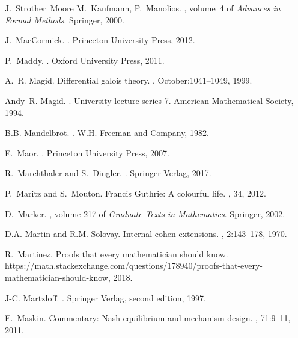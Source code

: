 \documentclass[12pt]{amsart}
\begin{document}
\begin{thebibliography}{100}
J.~Strother~Moore M.~Kaufmann, P.~Manolios.
, volume~4 of {\em
  Advances in Formal Methods}.
\newblock Springer, 2000.

J.~MacCormick.
.
\newblock Princeton University Press, 2012.

P.~Maddy.
.
\newblock Oxford University Press, 2011.

A.~R. Magid.
\newblock Differential galois theory.
, October:1041--1049, 1999.

Andy~R. Magid.
.
\newblock University lecture series 7. American Mathematical Society, 1994.

B.B. Mandelbrot.
.
\newblock W.H. Freeman and Company, 1982.

E.~Maor.
.
\newblock Princeton University Press, 2007.

R.~Marchthaler and S.~Dingler.
.
\newblock Springer Verlag, 2017.

P.~Maritz and S.~Mouton.
\newblock Francis {G}uthrie: A colourful life.
, 34, 2012.

D.~Marker.
, volume 217 of {\em Graduate
  Texts in Mathematics}.
\newblock Springer, 2002.

D.A. Martin and R.M. Solovay.
\newblock Internal cohen extensions.
, 2:143--178, 1970.

R.~Martinez.
\newblock Proofs that every mathematician should know.
\newblock
  {{\\}}https://math.stackexchange.com/questions/178940/proofs-that-every-mathematician-should-know,
  2018.

J-C. Martzloff.
.
\newblock Springer Verlag, second edition, 1997.

E.~Maskin.
\newblock Commentary: Nash equilibrium and mechanism design.
, 71:9--11, 2011.


\end{thebibliography}
\end{document}
